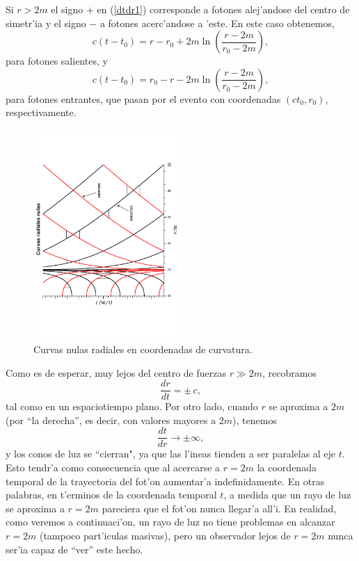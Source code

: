 Si $r>2m$ el signo $+$ en (\ref{dtdr1}) corresponde a fotones alej'andose del centro de simetr'ia y el signo $-$ a fotones acerc'andose a 'este. En este caso obtenemos,
\begin{equation}
 c(t-t_0)=r-r_0+2m\ln\left(\frac{r-2m}{r_0-2m}\right),  \label{rtfs}
\end{equation}
para fotones salientes, y
\begin{equation}
 c(t-t_0)=r_0-r-2m\ln\left(\frac{r-2m}{r_0-2m}\right), \label{rtfe}
\end{equation}
para fotones entrantes, que pasan por el evento con coordenadas $(ct_0,r_0)$, respectivamente.
\begin{figure}[H]
 \begin{center}
\includegraphics[height=8cm,angle=-90]{fig/fig-nullrays-cc-01.pdf}
\caption{Curvas nulas radiales en coordenadas de curvatura.}
\label{fig:nullrays-cc}
\end{center}
\end{figure}
Como es de esperar, muy lejos del centro de fuerzas $r\gg 2m$, recobramos
\begin{equation}
\frac{dr}{dt}=\pm\, c,
\end{equation}
tal como en un espaciotiempo plano. Por otro lado, cuando $r$ se aproxima a $2m$ (por ``la derecha'', es decir, con valores mayores a $2m$), tenemos
\begin{equation}
\frac{dt}{dr}\rightarrow\pm\infty,
\end{equation}
y los conos de luz se ``cierran", ya que las l'ineas tienden a ser
paralelas al eje $t$. Esto tendr'a como consecuencia que al acercarse a $r=2m$ la coordenada temporal de la trayectoria del fot'on aumentar'a indefinidamente. En otras palabras, en t'erminos de la coordenada temporal $t$, a medida que un rayo de luz se aproxima a $r=2m$ pareciera que el fot'on nunca llegar'a all'i. En realidad, como veremos a continuaci'on, un rayo de luz no tiene problemas en alcanzar $r=2m$ (tampoco part'iculas masivas), pero un observador lejos de $r=2m$ nunca ser'ia capaz de ``ver'' este hecho.

